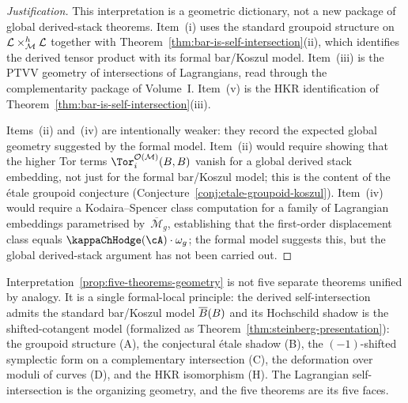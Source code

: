 \begin{proof}[Justification]
This interpretation is a geometric dictionary, not a new package of
global derived-stack theorems. Item~\textup{(i)} uses the standard
groupoid structure on\/ $\mathcal L \times_{\mathcal M}^h \mathcal L$ together with
Theorem~\ref{thm:bar-is-self-intersection}(ii), which identifies the
derived tensor product with its formal bar/Koszul model. Item~\textup{(iii)}
is the PTVV geometry of intersections of Lagrangians, read through the
complementarity package of Volume~I. Item~\textup{(v)} is the HKR
identification of Theorem~\ref{thm:bar-is-self-intersection}(iii).

Items~\textup{(ii)} and~\textup{(iv)} are intentionally weaker: they
record the expected global geometry suggested by the formal model.
Item~\textup{(ii)} would require showing that the higher Tor terms
$\Tor^{\cO(\cM)}_i(B,B)$ vanish for a global derived stack
embedding, not just for the formal bar/Koszul model; this is the
content of the \'etale groupoid conjecture
(Conjecture~\ref{conj:etale-groupoid-koszul}).
Item~\textup{(iv)} would require a Kodaira--Spencer class
computation for a family of Lagrangian embeddings parametrised
by~$\overline{\mathcal M}_g$, establishing that the first-order
displacement class equals $\kappaChHodge(\cA) \cdot \omega_g$; the formal
model suggests this, but the global derived-stack argument has not
been carried out.
\end{proof}

\begin{remark}
\label{rem:single-phenomenon}
Interpretation~\ref{prop:five-theorems-geometry} is not five separate
theorems unified by analogy. It is a single formal-local principle:
the derived self-intersection admits the standard bar/Koszul model
$\overline{B}(B)$ and its Hochschild shadow is the shifted-cotangent model
(formalized as Theorem~\ref{thm:steinberg-presentation}):
the groupoid structure (A), the conjectural \'etale shadow (B), the
$(-1)$-shifted symplectic form on a complementary intersection (C),
the deformation over moduli of curves (D), and the HKR isomorphism
(H). The Lagrangian self-intersection is the organizing geometry,
and the five theorems are its five faces.
\end{remark}

